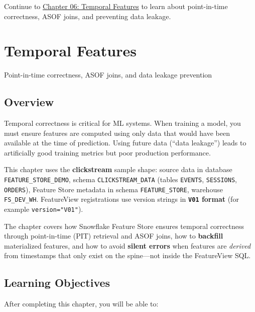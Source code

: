 \documentclass[
  letterpaper,
  DIV=11,
  numbers=noendperiod]{scrreprt}
\begin{document}
Continue to \protect\hyperlink{temporal-features}{Chapter 06: Temporal
Features} to learn about point-in-time correctness, ASOF joins, and
preventing data leakage.

\hypertarget{temporal-features}{%
\chapter{Temporal Features}\label{temporal-features}}

Point-in-time correctness, ASOF joins, and data leakage prevention

\hfill\break

\hypertarget{overview-6}{%
\section{Overview}\label{overview-6}}

Temporal correctness is critical for ML systems. When training a model,
you must ensure features are computed using only data that would have
been available at the time of prediction. Using future data (``data
leakage'') leads to artificially good training metrics but poor
production performance.

This chapter uses the \textbf{clickstream} sample shape: source data in
database \texttt{FEATURE\_STORE\_DEMO}, schema
\texttt{CLICKSTREAM\_DATA} (tables \texttt{EVENTS}, \texttt{SESSIONS},
\texttt{ORDERS}), Feature Store metadata in schema
\texttt{FEATURE\_STORE}, warehouse \texttt{FS\_DEV\_WH}. FeatureView
registrations use version strings in \textbf{\texttt{V01} format} (for
example \texttt{version="V01"}).

The chapter covers how Snowflake Feature Store ensures temporal
correctness through point-in-time (PIT) retrieval and ASOF joins, how to
\textbf{backfill} materialized features, and how to avoid \textbf{silent
errors} when features are \emph{derived} from timestamps that only exist
on the spine---not inside the FeatureView SQL.

\hypertarget{learning-objectives-5}{%
\section{Learning Objectives}\label{learning-objectives-5}}

After completing this chapter, you will be able to:
\end{document}
